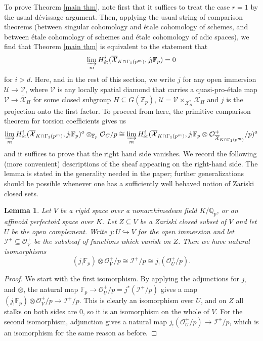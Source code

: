 \documentclass{amsart}
\newtheorem{lemma}[subsubsection]{Lemma}
\theoremstyle{remark}
\numberwithin{equation}{subsection}
\newcommand{\F}{\FF}
\newcommand{\Q}{\QQ}
\newcommand{\Z}{\ZZ}
\newcommand{\FF}{{\mathbb F}}
\newcommand{\QQ}{{\mathbb Q}}
\newcommand{\ZZ}{{\mathbb Z}}
\newcommand{\cI}{{\mathcal I}}
\newcommand{\cO}{{\mathcal O}}
\newcommand{\cU}{{\mathcal U}}
\newcommand{\cV}{{\mathcal V}}
\newcommand{\cX}{{\mathcal X}}
\newcommand{\Zp}{\Z_p}
\newcommand{\Qp}{\Q_p}
\newcommand{\et}{\mathrm{\acute{e}t}}
\newcommand{\ocX}{\overline{\mathcal{X}}}
\newcommand{\sub}{\subseteq}
\renewcommand{\(}{\left(}
\renewcommand{\)}{\right)}
\begin{document}
To prove Theorem \ref{main thm}, note first that it suffices to treat the case $r=1$ by the usual d\'evissage argument. Then, applying the usual string of comparison theorems (between singular cohomology and \'etale cohomology of schemes, and between \'etale cohomology of schemes and \'etale cohomology of adic spaces), we find that Theorem \ref{main thm} is equivalent to the statement that 
\[
 \varinjlim_{m} H^{i}_{\et}(\ocX_{K \cap \Gamma_1(p^m)},j_{!}\F_{p})=0 
\]   
for $i>d$. Here, and in the rest of this section, we write $j$ for any open immersion $\cU \to \cV$, where $\cV$ is any locally spatial diamond that carries a quasi-pro-\'etale map $\cV \to \ocX_{H}$ for some closed subgroup $H \sub G(\Zp)$, $\cU = \cV \times_{\cX^{\ast}_H}\cX_H$ and $j$ is the projection onto the first factor. To proceed from here, the primitive comparison theorem for torsion coefficients \cite[Thm. 3.13]{scholze-survey} gives us
\[
 \varinjlim_{m} H^{i}_{\et}(\ocX_{K \cap \Gamma_1(p^{m})},j_{!}\F_{p})^{a} \otimes_{\F_p}\cO_C/p \cong \varinjlim_{m} H^{i}_{\et}(\ocX_{K \cap \Gamma_1(p^{m})},j_{!}\F_{p}\otimes \cO_{\ocX_{K \cap \Gamma_1(p^m)}}^{+}/p)^{a}
 \]
and it suffices to prove that the right hand side vanishes. We record the following (more convenient) descriptions of the sheaf appearing on the right-hand side. The lemma is stated in the generality needed in the paper; further generalizations should be possible whenever one has a sufficiently well behaved notion of Zariski closed sets.

\begin{lemma}\label{lower shriek and ideals}
Let $V$ be a rigid space over a nonarchimedean field $K/\Qp$, or an affinoid perfectoid space over $K$. Let $Z\sub V$ be a Zariski closed subset of $V$ and let $U$ be the open complement. Write $j \colon U \hookrightarrow V$ for the open immersion and let $\cI^{+}\sub \cO_{V}^{+}$ be the subsheaf of functions which vanish on $Z$. Then we have natural isomorphisms
$$ (j_{!}\F_{p}) \otimes \cO_{V}^{+}/p \cong \cI^{+}/p \cong j_{!}(\cO_{U}^{+}/p). $$ 
\end{lemma}

\begin{proof}
We start with the first isomorphism. By applying the adjunctions for $j_{!}$ and $\otimes$, the natural map $\F_{p} \to \cO_{U}^{+}/p = j^{\ast}(\cI^{+}/p)$ gives a map $(j_{!}\F_{p}) \otimes \cO_{V}^{+}/p \to \cI^{+}/p$. This is clearly an isomorphism over $U$, and on $Z$ all stalks on both sides are $0$, so it is an isomorphism on the whole of $V$. For the second isomorphism, adjunction gives a natural map $j_{!}(\cO_{U}^{+}/p) \to \cI^{+}/p$, which is an isomorphism for the same reason as before.
\end{proof}
\end{document}
